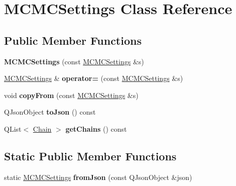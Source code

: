 \hypertarget{class_m_c_m_c_settings}{\section{M\-C\-M\-C\-Settings Class Reference}
\label{class_m_c_m_c_settings}
}
\subsection*{Public Member Functions}
\begin{DoxyCompactItemize}
\item 
\hypertarget{class_m_c_m_c_settings_a0860eb2421431fbfd54858c6f541db54}{{\bfseries M\-C\-M\-C\-Settings} (const \hyperlink{class_m_c_m_c_settings}{M\-C\-M\-C\-Settings} \&s)}\label{class_m_c_m_c_settings_a0860eb2421431fbfd54858c6f541db54}

\item 
\hypertarget{class_m_c_m_c_settings_a481825883abedac12de5477909768854}{\hyperlink{class_m_c_m_c_settings}{M\-C\-M\-C\-Settings} \& {\bfseries operator=} (const \hyperlink{class_m_c_m_c_settings}{M\-C\-M\-C\-Settings} \&s)}\label{class_m_c_m_c_settings_a481825883abedac12de5477909768854}

\item 
\hypertarget{class_m_c_m_c_settings_aa68873820b09f45884961baac2a9c9a0}{void {\bfseries copy\-From} (const \hyperlink{class_m_c_m_c_settings}{M\-C\-M\-C\-Settings} \&s)}\label{class_m_c_m_c_settings_aa68873820b09f45884961baac2a9c9a0}

\item 
\hypertarget{class_m_c_m_c_settings_a91aa375c617447b1a32d1d69ad10dfe9}{Q\-Json\-Object {\bfseries to\-Json} () const }\label{class_m_c_m_c_settings_a91aa375c617447b1a32d1d69ad10dfe9}

\item 
\hypertarget{class_m_c_m_c_settings_af14080a47457d96ddb70a630c9ec8efd}{Q\-List$<$ \hyperlink{struct_chain}{Chain} $>$ {\bfseries get\-Chains} () const }\label{class_m_c_m_c_settings_af14080a47457d96ddb70a630c9ec8efd}

\end{DoxyCompactItemize}
\subsection*{Static Public Member Functions}
\begin{DoxyCompactItemize}
\item 
\hypertarget{class_m_c_m_c_settings_aac304bd8a918faee1999f922662b2ab5}{static \hyperlink{class_m_c_m_c_settings}{M\-C\-M\-C\-Settings} {\bfseries from\-Json} (const Q\-Json\-Object \&json)}\label{class_m_c_m_c_settings_aac304bd8a918faee1999f922662b2ab5}

\end{DoxyCompactItemize}
